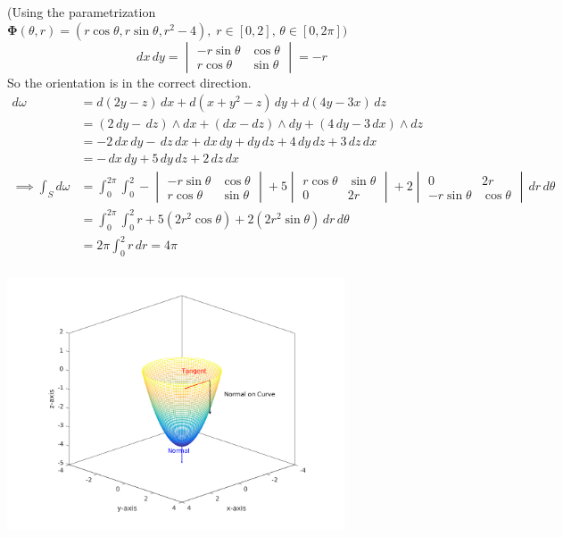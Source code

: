 \documentclass{article}
\begin{document}
\begin{enumerate}
        (Using the parametrization 
        $\boldsymbol \Phi (\theta,r) 
        = (r\cos \theta, r\sin \theta, r^2 - 4),\; 
        r \in [0, 2],\, \theta \in [0, 2\pi])$
        \[ dx\, dy = 
        \begin{vmatrix} -r\sin\theta & \cos \theta \\
                         r \cos \theta & \sin \theta 
        \end{vmatrix} = -r\]
        So the orientation is in the correct direction.
        \begin{align*}
            d\omega &= d(2y-z)\, dx + d(x+y^2-z)\, dy + d(4y -3x)\, dz \\
            &= (2\, dy - \,dz) \wedge dx 
            + (dx - dz) \wedge dy 
            + (4 \, dy -  3\, dx) \wedge dz \\
            &= -2\, dx\, dy - \,dz \, dx + dx \, dy + dy \, dz 
            + 4 \, dy \, dz +  3\, dz \, dx \\
            &= -\, dx\, dy + 5 \, dy \, dz +  2\, dz \, dx \\
            \implies \int_S d\omega &= \int_0^{2\pi} \int_0^2 
            - \begin{vmatrix} -r \sin\theta & \cos \theta \\ 
                               r \cos \theta & \sin \theta \end{vmatrix}
            + 5 \begin{vmatrix} r\cos \theta & \sin \theta \\ 
                                0 & 2r \end{vmatrix}
            + 2 \begin{vmatrix} 0 & 2r \\ 
                               -r\sin\theta & \cos \theta \end{vmatrix} 
            \, dr \, d\theta \\
            &= \int_0^{2\pi} \int_0^2 r + 5 (2r^2\cos \theta) 
            + 2(2r^2 \sin \theta) \, dr \, d\theta\\
            &= 2\pi \int_0^2 r \, dr = 4\pi \\
        \end{align*} 

            \includegraphics[width=0.75\textwidth,center]{b42-a10-6}


\end{enumerate}
\end{document}
